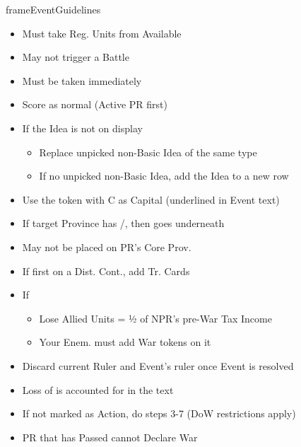\documentclass[10pt]{article}
\newlength{\fhEventGuidelines} \setlength\fhEventGuidelines{35\baselineskip}
\begin{document}
\begin{dynamiccontents*}{frameEventGuidelines}
\begin{eubox}{\fhEventGuidelines}
\begin{multicols}{2}
\begin{itemize}
			\item Must take Reg. Units from Available \manpower
			\item May not trigger a Battle
		\end{itemize}
		\begin{itemize}
			\item Must be taken immediately
		\end{itemize}
		\begin{itemize}
			\item Score \prestige as normal (Active PR first)
			\item If the Idea is not on display
			\begin{itemize}
				\item Replace unpicked non-Basic Idea of the same type
				\item If no unpicked non-Basic Idea, add the Idea to a new row
			\end{itemize}
		\end{itemize}
		\begin{itemize}
			\item Use the token with C as Capital (underlined in Event text)
			\item If target Province has \town/\vassal, then \dnpr goes underneath
			\item May not be placed on PR's Core Prov.
			\item If first \dnpr on a Dist. Cont., add Tr. Cards
		\end{itemize}
		\begin{itemize}
			\item If \activeally
			\begin{itemize}
				\item Lose Allied Units = ½ of NPR's pre-War Tax Income
				\item Your Enem. must add War tokens on it
			\end{itemize}
		\end{itemize}
		\begin{itemize}
			\item Discard current Ruler and Event's ruler once Event is resolved
		\end{itemize}
		\begin{itemize}
			\item Loss of \authority is accounted for in the text
		\end{itemize}
		\begin{itemize}
			\item If not marked as  Action, do steps 3-7 (DoW restrictions apply)
			\item PR that has Passed cannot Declare War
		\end{itemize}
	\end{multicols}
\end{eubox}\end{dynamiccontents*}
\end{document}
